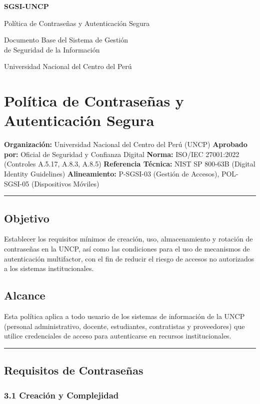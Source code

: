 \documentclass[10pt,letterpaper]{article}
\newcommand{\makecover}{
\begin{titlepage}
\centering
\vspace*{2cm}
{\Huge\bfseries\color{uncpblue} SGSI-UNCP\par}
\vspace{0.7cm}
{\LARGE Política de Contraseñas y Autenticación Segura\par}
\vspace{0.5cm}
{\large Documento Base del Sistema de Gestión\\de Seguridad de la Información\par}
\vspace{1.5cm}
{\small Universidad Nacional del Centro del Perú\par}
\vfill
\end{titlepage}
}
\begin{document}
\makecover
\setcounter{tocdepth}{2}
\RaggedRight
\tableofcontents
\newpage

\RaggedRight
\section{Política de Contraseñas y Autenticación
Segura}\label{poluxedtica-de-contraseuxf1as-y-autenticaciuxf3n-segura}

\textbf{Organización:} Universidad Nacional del Centro del Perú (UNCP)
\textbf{Aprobado por:} Oficial de Seguridad y Confianza Digital
\textbf{Norma:} ISO/IEC 27001:2022 (Controles A.5.17, A.8.3, A.8.5)
\textbf{Referencia Técnica:} NIST SP 800-63B (Digital Identity
Guidelines) \textbf{Alineamiento:} P-SGSI-03 (Gestión de Accesos),
POL-SGSI-05 (Dispositivos Móviles)

\begin{center}\rule{0.5\linewidth}{0.5pt}\end{center}

\subsection{Objetivo}\label{objetivo}

Establecer los requisitos mínimos de creación, uso, almacenamiento y
rotación de contraseñas en la UNCP, así como las condiciones para el uso
de mecanismos de autenticación multifactor, con el fin de reducir el
riesgo de accesos no autorizados a los sistemas institucionales.

\subsection{Alcance}\label{alcance}

Esta política aplica a todo usuario de los sistemas de información de la
UNCP (personal administrativo, docente, estudiantes, contratistas y
proveedores) que utilice credenciales de acceso para autenticarse en
recursos institucionales.

\begin{center}\rule{0.5\linewidth}{0.5pt}\end{center}

\subsection{Requisitos de
Contraseñas}\label{requisitos-de-contraseuxf1as}

\subsubsection{3.1 Creación y
Complejidad}\label{creaciuxf3n-y-complejidad}
\end{document}
